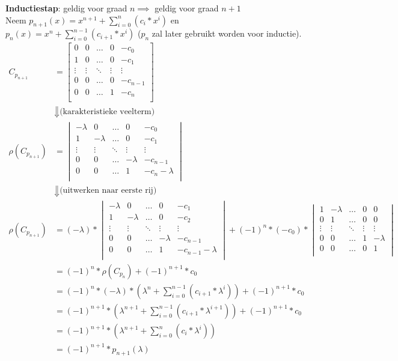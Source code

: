 \documentclass{article}
\begin{document}
\textbf{Inductiestap}: geldig voor graad \(n \implies\) geldig voor graad \(n + 1\) \\
Neem \(p_{n+1}(x) = x^{n+1} + \sum_{i=0}^{n}{(c_i*x^i)}\) en \(p_n(x) = x^n + \sum_{i=0}^{n-1}{(c_{i+1}*x^i)}\) (\(p_n\) zal later gebruikt worden voor inductie).
\begin{align*}
 C_{p_{n+1}} &= \begin{bmatrix}
	0 & 0 & \hdots & 0 & -c_0\\
	1 & 0 & \hdots & 0 & -c_1\\
	\vdots & \vdots & \ddots & \vdots & \vdots\\
	0 & 0 & \hdots & 0 & -c_{n-1}\\
	0 & 0 & \hdots & 1 & -c_n\\
 \end{bmatrix} \\
 &\Downarrow \text{(karakteristieke veelterm)} \\
 \rho(C_{p_{n+1}}) &= \begin{vmatrix}
	-\lambda & 0 & \hdots & 0 & -c_0\\
	1 & -\lambda & \hdots & 0 & -c_1\\
	\vdots & \vdots & \ddots & \vdots & \vdots\\
	0 & 0 & \hdots & -\lambda & -c_{n-1}\\
	0 & 0 & \hdots & 1 & -c_n-\lambda\\
 \end{vmatrix} \\
 &\Downarrow \text{(uitwerken naar eerste rij)} \\
 \rho(C_{p_{n+1}}) &= (-\lambda)* \begin{vmatrix}
	-\lambda & 0 & \hdots & 0 & -c_1\\
	1 & -\lambda & \hdots & 0 & -c_2\\
	\vdots & \vdots & \ddots & \vdots & \vdots\\
	0 & 0 & \hdots & -\lambda & -c_{n-1}\\
    0 & 0 & \hdots & 1 & -c_{n-1} - \lambda\\
 \end{vmatrix} + (-1)^n * (-c_0) * \begin{vmatrix}
	1 & -\lambda & \hdots & 0 & 0\\
	0 & 1 & \hdots & 0 & 0\\
	\vdots & \vdots & \ddots & \vdots & \vdots\\
    0 & 0 & \hdots & 1 & -\lambda\\
	0 & 0 & \hdots & 0 & 1\\
 \end{vmatrix} \\
 &= (-1)^n * \rho(C_{p_n}) + (-1)^{n+1} * c_0 \\
 &= (-1)^n * (-\lambda) * \left(\lambda^n + \sum_{i=0}^{n-1}{(c_{i+1}*\lambda^i)}\right) + (-1)^{n+1} * c_0 \\
 &= (-1)^{n+1} * \left(\lambda^{n+1} + \sum_{i=0}^{n-1}{(c_{i+1}*\lambda^{i+1})}\right) + (-1)^{n+1} * c_0 \\
 &= (-1)^{n+1} * \left(\lambda^{n+1} + \sum_{i=0}^{n}{(c_i * \lambda^i)}\right) \\
 &= (-1)^{n+1} * p_{n+1}(\lambda)
\end{align*}
\end{document}
